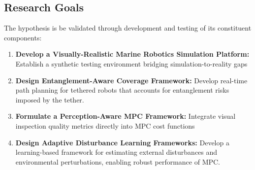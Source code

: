 \subsection{Research Goals}
The hypothesis is  be validated through development and testing of its constituent components:



\begin{enumerate}

\item \textbf{Develop a Visually-Realistic Marine Robotics Simulation Platform:}  
Establish a synthetic testing environment bridging simulation-to-reality gaps


\item \textbf{Design Entanglement-Aware Coverage Framework:}  
Develop real-time path planning for tethered robots that accounts for entanglement risks imposed by the tether. 

\item \textbf{Formulate a Perception-Aware \ac{MPC} Framework:}  
Integrate visual inspection quality metrics directly into MPC cost functions


\item \textbf{Design Adaptive Disturbance Learning Frameworks:}  
Develop a learning-based framework for estimating external disturbances and environmental perturbations, enabling robust performance of MPC.

\end{enumerate}


